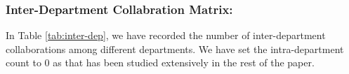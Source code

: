 \documentclass[conference,compsoc]{IEEEtran}
\begin{document}
\subsubsection*{Inter-Department Collabration Matrix:} 
In Table \ref{tab:inter-dep}, we have recorded the number of inter-department collaborations among different departments. We have set the intra-department count to 0 as that has been studied extensively in the rest of the paper.
\begin{table}[h]
\centering
\caption{Number of Interdepartment collaborations}
\label{tab:inter-dep}
\end{table}
\end{document}

